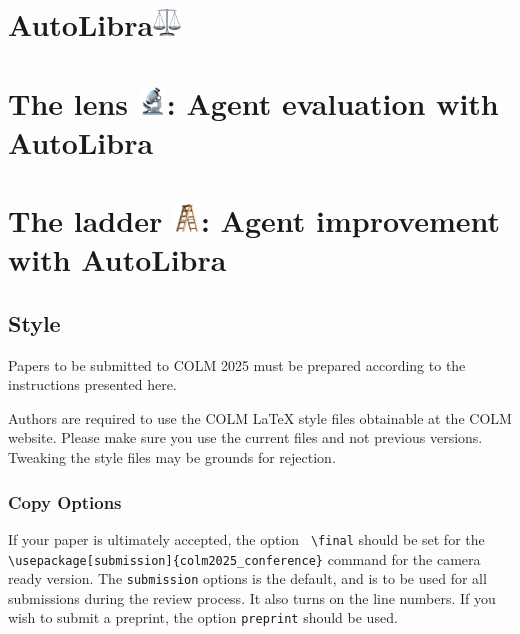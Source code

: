 \documentclass{article} %
\begin{document}
\section{AutoLibra\protect\includegraphics[height=1em]{Template-2025/figs/scale.png}}


\section{The lens \protect\includegraphics[height=1em]{Template-2025/figs/microscope.png}: Agent evaluation with AutoLibra}
\section{The ladder \protect\includegraphics[height=1em]{Template-2025/figs/ladder.png}: Agent improvement with AutoLibra}
\subsection{Style}

Papers to be submitted to COLM 2025 must be prepared according to the
instructions presented here.


Authors are required to use the COLM \LaTeX{} style files obtainable at the
COLM website. Please make sure you use the current files and
not previous versions. Tweaking the style files may be grounds for rejection.

\subsubsection{Copy Options}

If your paper is ultimately accepted, the option {\tt
  {\textbackslash}final} should be set  for the {\tt {\textbackslash}usepackage[submission]\{colm2025\_conference\}} command for the camera ready version. The {\tt submission} options is the default, and is to be used for all submissions during the review process. It also turns on the line numbers. If you wish to submit a preprint, the option {\tt preprint} should be used.
  
\end{document}
